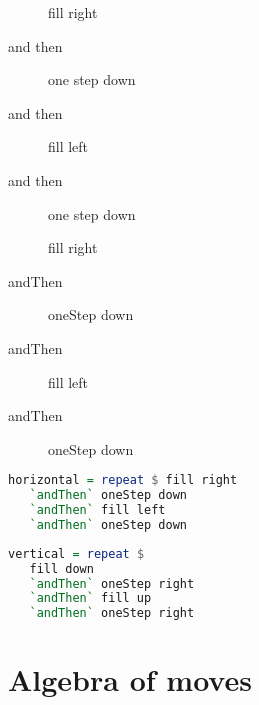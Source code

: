 \documentclass[10pt]{beamer}
\begin{document}
\begin{frame}[fragile]
\begin{description}
      \item[] fill right
      \item[and then] one step down
      \item[and then] fill left
      \item[and then] one step down
  \end{description}
\end{frame}
\begin{frame}[fragile]
\begin{description}
      \item[] fill right
      \item[andThen] oneStep down
      \item[andThen] fill left
      \item[andThen] oneStep down
  \end{description}
\end{frame}

\begin{frame}[fragile]
\begin{lstlisting}[language=haskell, basicstyle=\ttfamily]
horizontal = repeat $ fill right
   `andThen` oneStep down
   `andThen` fill left
   `andThen` oneStep down
\end{lstlisting}
\end{frame}

\begin{frame}[fragile]
\begin{lstlisting}[language=haskell, basicstyle=\ttfamily]
vertical = repeat $
   fill down
   `andThen` oneStep right
   `andThen` fill up
   `andThen` oneStep right
\end{lstlisting}
\end{frame}

\section{Algebra of moves}
\end{document}
